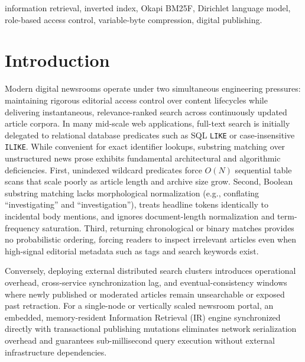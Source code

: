 \documentclass[conference]{IEEEtran}
\begin{document}
\begin{IEEEkeywords}
information retrieval, inverted index, Okapi BM25F, Dirichlet language model, role-based access control, variable-byte compression, digital publishing.
\end{IEEEkeywords}

\section{Introduction}
Modern digital newsrooms operate under two simultaneous engineering pressures: maintaining rigorous editorial access control over content lifecycles while delivering instantaneous, relevance-ranked search across continuously updated article corpora. In many mid-scale web applications, full-text search is initially delegated to relational database predicates such as SQL \texttt{LIKE} or case-insensitive \texttt{ILIKE}. While convenient for exact identifier lookups, substring matching over unstructured news prose exhibits fundamental architectural and algorithmic deficiencies. First, unindexed wildcard predicates force $O(N)$ sequential table scans that scale poorly as article length and archive size grow. Second, Boolean substring matching lacks morphological normalization (e.g., conflating ``investigating'' and ``investigation''), treats headline tokens identically to incidental body mentions, and ignores document-length normalization and term-frequency saturation. Third, returning chronological or binary matches provides no probabilistic ordering, forcing readers to inspect irrelevant articles even when high-signal editorial metadata such as tags and search keywords exist.

Conversely, deploying external distributed search clusters introduces operational overhead, cross-service synchronization lag, and eventual-consistency windows where newly published or moderated articles remain unsearchable or exposed past retraction. For a single-node or vertically scaled newsroom portal, an embedded, memory-resident Information Retrieval (IR) engine synchronized directly with transactional publishing mutations eliminates network serialization overhead and guarantees sub-millisecond query execution without external infrastructure dependencies.
\end{document}
